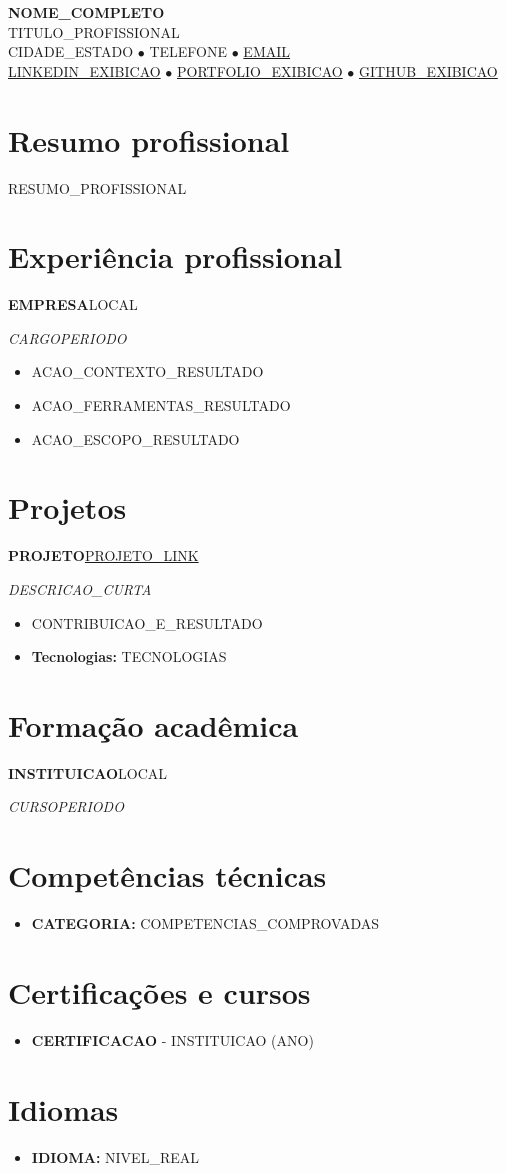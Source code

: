 \documentclass[a4paper,10pt]{article}
\newcommand{\cventry}[4]{%
  \par\noindent\textbf{#1}\hfill #2\par
  \noindent\textit{#3}\hfill\textit{#4}\par
}
\begin{document}
\begin{center}
  {\LARGE\textbf{{{NOME_COMPLETO}}}}\\[0.15em]
  {\normalsize {{TITULO_PROFISSIONAL}}}\\[0.15em]
  {{CIDADE_ESTADO}} $\bullet$ {{TELEFONE}} $\bullet$
  \href{mailto:{{EMAIL}}}{{{EMAIL}}}\\[0.05em]
  \href{{{LINKEDIN_URL}}}{{{LINKEDIN_EXIBICAO}}} $\bullet$
  \href{{{PORTFOLIO_URL}}}{{{PORTFOLIO_EXIBICAO}}} $\bullet$
  \href{{{GITHUB_URL}}}{{{GITHUB_EXIBICAO}}}
\end{center}

\section{Resumo profissional}
{{RESUMO_PROFISSIONAL}}

\section{Experiência profissional}
\cventry{{{EMPRESA}}}{{{LOCAL}}}{{{CARGO}}}{{{PERIODO}}}
\begin{itemize}
  \item {{ACAO_CONTEXTO_RESULTADO}}
  \item {{ACAO_FERRAMENTAS_RESULTADO}}
  \item {{ACAO_ESCOPO_RESULTADO}}
\end{itemize}

\section{Projetos}
\cventry{{{PROJETO}}}{\href{{{PROJETO_URL}}}{{{PROJETO_LINK}}}}{{{DESCRICAO_CURTA}}}{}
\begin{itemize}
  \item {{CONTRIBUICAO_E_RESULTADO}}
  \item \textbf{Tecnologias:} {{TECNOLOGIAS}}
\end{itemize}

\section{Formação acadêmica}
\cventry{{{INSTITUICAO}}}{{{LOCAL}}}{{{CURSO}}}{{{PERIODO}}}

\section{Competências técnicas}
\begin{itemize}
  \item \textbf{{{CATEGORIA}}:} {{COMPETENCIAS_COMPROVADAS}}
\end{itemize}

\section{Certificações e cursos}
\begin{itemize}
  \item \textbf{{{CERTIFICACAO}}} - {{INSTITUICAO}} ({{ANO}})
\end{itemize}

\section{Idiomas}
\begin{itemize}
  \item \textbf{{{IDIOMA}}:} {{NIVEL_REAL}}
\end{itemize}
\end{document}
